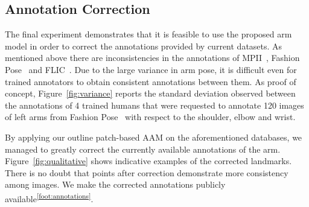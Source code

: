 \subsection{Annotation Correction}
\label{exp:qualitative}
The final experiment demonstrates that it is feasible to use the proposed arm model in order to correct the annotations provided by current datasets. As mentioned above there are inconsistencies in the annotations of MPII~\cite{andriluka14cvpr}, Fashion Pose~\cite{dantone2013human} and FLIC~\cite{sapp2013modec}. Due to the large variance in arm pose, it is difficult even for trained annotators to obtain consistent annotations between them. As proof of concept, Figure~\ref{fig:variance} reports the standard deviation observed between the annotations of 4 trained humans that were requested to annotate 120 images of left arms from Fashion Pose~\cite{dantone2013human} with respect to the shoulder, elbow and wrist.

By applying our outline patch-based AAM on the aforementioned databases, we managed to greatly correct the currently available annotations of the arm. Figure~\ref{fig:qualitative} shows indicative examples of the corrected landmarks. There is no doubt that points after correction demonstrate more consistency among images. We make the corrected annotations publicly available\textsuperscript{\ref{foot:annotations}}.


















